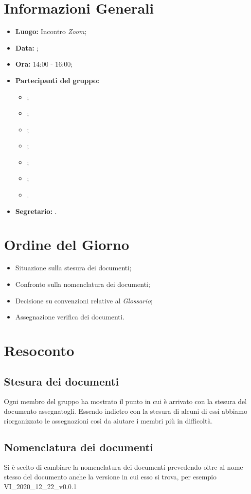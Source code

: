 \section{Informazioni Generali}
\begin{itemize}
\item \textbf{Luogo:} Incontro \textit{Zoom};
\item \textbf{Data:} \Data;
\item \textbf{Ora:} 14:00 - 16:00;
\item \textbf{Partecipanti del gruppo:}
	\begin{itemize}
		\item \BL{}; 
		\item \FF{};
		\item \MM{}; 
		\item \PC{};
		\item \TG{};
		\item \TL{};
		\item \VD{}.
	\end{itemize} 
\item \textbf{Segretario:} \PC{}.
\end{itemize}

\section{Ordine del Giorno}
\begin{itemize}
 \item Situazione sulla stesura dei documenti;
 \item Confronto sulla nomenclatura dei documenti;
 \item Decisione su convenzioni relative al \textit{Glossario};
 \item Assegnazione verifica dei documenti.
\end{itemize}

\section{Resoconto}
\subsection{Stesura dei documenti}
Ogni membro del gruppo ha mostrato il punto in cui è arrivato con la stesura del documento assegnatogli. Essendo indietro con la stesura di alcuni di essi abbiamo riorganizzato le assegnazioni così da aiutare i membri più in difficoltà.

\subsection{Nomenclatura dei documenti}
Si è scelto di cambiare la nomenclatura dei documenti prevedendo oltre al nome stesso del documento anche la versione in cui esso si trova, per esempio VI\_2020\_12\_22\_v0.0.1

